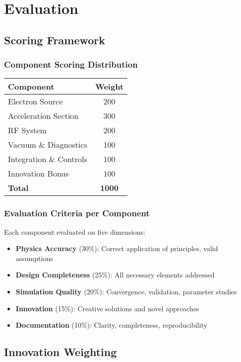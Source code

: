 
\renewcommand{\thesection}{E}
\section{Evaluation}

\subsection{Scoring Framework}

\subsubsection{Component Scoring Distribution}
\begin{tabular}{lc}
\toprule
Component & Weight \\
\midrule
Electron Source & 200 \\
Acceleration Section & 300 \\
RF System & 200 \\
Vacuum \& Diagnostics & 100 \\
Integration \& Controls & 100 \\
Innovation Bonus & 100 \\
\midrule
\textbf{Total} & \textbf{1000} \\
\bottomrule
\end{tabular}

\subsubsection{Evaluation Criteria per Component}
Each component evaluated on five dimensions:
\begin{itemize}[noitemsep]
    \item \textbf{Physics Accuracy} (30\%): Correct application of principles, valid assumptions
    \item \textbf{Design Completeness} (25\%): All necessary elements addressed
    \item \textbf{Simulation Quality} (20\%): Convergence, validation, parameter studies
    \item \textbf{Innovation} (15\%): Creative solutions and novel approaches
    \item \textbf{Documentation} (10\%): Clarity, completeness, reproducibility
\end{itemize}

\subsection{Innovation Weighting}


